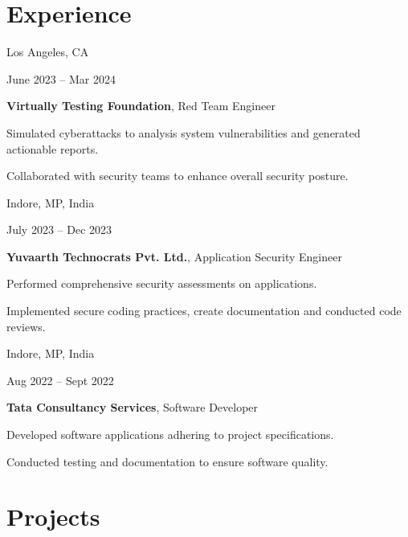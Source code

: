 \documentclass[10pt, A4]{article}
\begin{document}
	\section{Experience}
	
	\begin{twocolentry}{
		Los Angeles, CA
		
		June 2023 – Mar 2024
	}
	\textbf{Virtually Testing Foundation}, Red Team Engineer
	\begin{highlights}
		\item Simulated cyberattacks to analysis system vulnerabilities and generated actionable reports.
		\item Collaborated with security teams to enhance overall security posture.
	\end{highlights}
	\end{twocolentry}
	
	\vspace{0.1 cm}
	
	\begin{twocolentry}{
		Indore, MP, India
		
		July 2023 – Dec 2023
	}
	\textbf{Yuvaarth Technocrats Pvt. Ltd.}, Application Security Engineer
	\begin{highlights}
		\item Performed comprehensive security assessments on applications.
		\item Implemented secure coding practices, create documentation and conducted code reviews.
	\end{highlights}
	\end{twocolentry}
	
	\vspace{0.1 cm}
	
	
	\vspace{0.1 cm}
	
	\begin{twocolentry}{
		Indore, MP, India
		
		Aug 2022 – Sept 2022
	}
	\textbf{Tata Consultancy Services}, Software Developer
	\begin{highlights}
		\item Developed software applications adhering to project specifications.
		\item Conducted testing and documentation to ensure software quality.
	\end{highlights}
	\end{twocolentry}
	
	\section{Projects}
	
\end{document}
